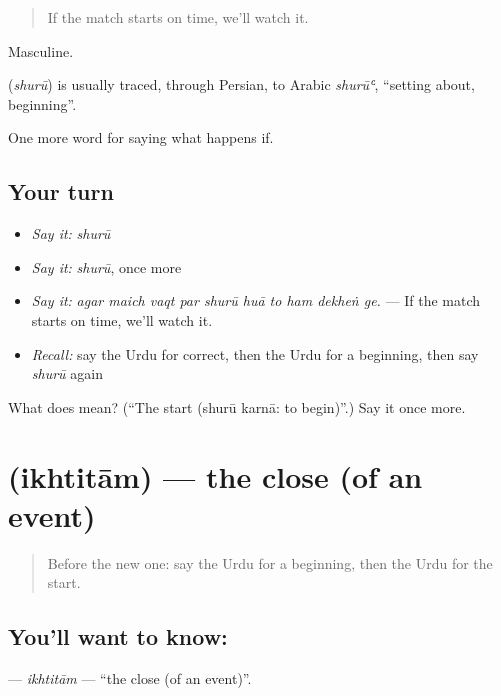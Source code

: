 \begin{quote}
If the match starts on time, we'll watch it.
\end{quote}

Masculine.

\begin{cousinweb}
\textbf{} (\emph{shurū}) is usually traced, through Persian, to Arabic \emph{shurūʿ}, \textquotedblleft{}setting about, beginning\textquotedblright{}.
\end{cousinweb}

\begin{grammarlens}[title={What you've built}]
One more word for saying what happens if.
\end{grammarlens}

\subsection*{Your turn}
\begin{itemize}
\raggedright
  \item \emph{Say it:} \emph{shurū}
  \item \emph{Say it:} \emph{shurū}, once more
  \item \emph{Say it:} \emph{agar maich vaqt par shurū huā to ham dekheṅ ge.} — If the match starts on time, we'll watch it.
  \item \emph{Recall:} say the Urdu for correct, then the Urdu for a beginning, then say \emph{shurū} again
\end{itemize}

\begin{tcolorbox}[breakable,colback=teal!4,colframe=teal!35!black,title={Before you move on}]
What does  mean? (\textquotedblleft{}The start (shurū karnā: to begin)\textquotedblright{}.) Say it once more.
\end{tcolorbox}
\section[\texorpdfstring{\ur{اختتام} (ikhtitām)}{اختتام (ikhtitām)}]{ (ikhtitām) — the close (of an event)}

\label{lesson:UR-C544-ikhtitam}



\begin{quote}
Before the new one: say the Urdu for a beginning, then the Urdu for the start.
\end{quote}

\subsection*{You'll want to know: }
\textbf{} — \emph{ikhtitām} — \textquotedblleft{}the close (of an event)\textquotedblright{}.

